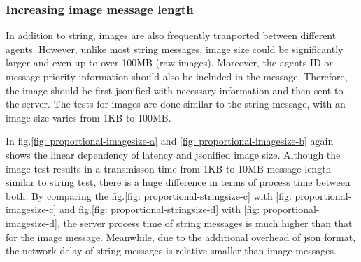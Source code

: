 \subsubsection{Increasing image message length}
In addition to string, images are also frequently tranported between different agents. 
However, unlike most string messages, image size could be significantly larger 
and even up to over 100MB (raw images). Moreover, the agents ID or message priority 
information should also be included in the message. Therefore, the image should 
be first jsonified with necessary information and then sent to the server. 
The tests for images are done similar to the string message, with an image size 
varies from 1KB to 100MB. 


In fig.\ref{fig: proportional-imagesize-a} and \ref{fig: proportional-imagesize-b} 
again shows the linear dependency of latency and jsonified image size. 
Although the image test results in a 
transmisson time from 1KB to 10MB message length similar to string test, 
there is a huge difference in terms of process time between both. By comparing the 
fig.\ref{fig: proportional-stringsize-c} with \ref{fig: proportional-imagesize-c} 
and fig.\ref{fig: proportional-stringsize-d} with \ref{fig: proportional-imagesize-d}, 
the server process time of string messages is much higher than that for the 
image message. Meanwhile, due to the additional overhead of json format, the network 
delay of string messages is relative smaller than image messages. 


